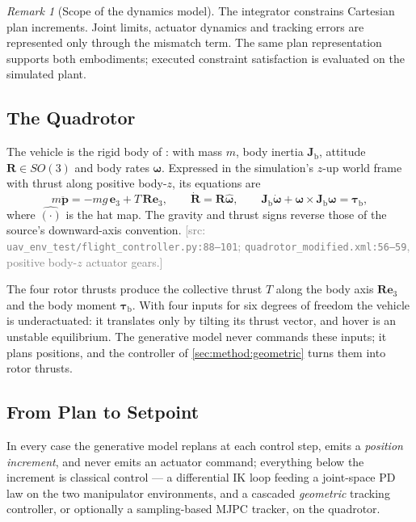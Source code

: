 \documentclass[headsepline,footsepline,footinclude=false,oneside,fontsize=11pt,paper=a4,listof=totoc,bibliography=totoc]{scrbook}
\theoremstyle{definition}
\theoremstyle{plain}
\theoremstyle{remark}
\newtheorem{remark}{Remark}[chapter]
\newcommand{\vect}[1]{\boldsymbol{#1}}
\newcommand{\matr}[1]{\boldsymbol{#1}}
\newcommand{\sidx}[1]{_{\textrm{#1}}}
\newcommand{\unitvec}[1]{\textbf{e}_{#1}}
\newif\ifsubmission
\newcommand{\srcnote}[1]{\ifsubmission\else\textcolor{gray}{\footnotesize\textsf{[src: #1]}}\fi}
\begin{document}
\begin{remark}[Scope of the dynamics model]\label{rem:eulermodel}
The integrator constrains Cartesian plan increments. Joint limits, actuator dynamics and tracking
errors are represented only through the mismatch term. The same plan representation supports both
embodiments; executed constraint satisfaction is evaluated on the simulated plant.
\end{remark}

\subsection{The Quadrotor}\label{sec:method:quadrotor}

The vehicle is the rigid body of \parencite[Eqs.~(2)--(5)]{lee2010geometric}: with mass $m$, body
inertia $\matr{J}\sidx{b}$, attitude $\matr{R}\in SO(3)$ and body rates $\vect{\omega}$.
Expressed in the simulation's $z$-up world frame with thrust along positive body-$z$, its equations are
\begin{equation}\label{eq:method:dep:plant}
  m\ddot{\vect{p}} = -m g\,\unitvec{3} + T\,\matr{R}\unitvec{3},
  \qquad
  \dot{\matr{R}} = \matr{R}\hat{\vect{\omega}},
  \qquad
  \matr{J}\sidx{b}\dot{\vect{\omega}} + \vect{\omega}\times\matr{J}\sidx{b}\vect{\omega} = \vect{\tau}\sidx{b},
\end{equation}
where $\hat{(\cdot)}$ is the hat map. The gravity and thrust signs reverse those of the
source's downward-axis convention.
\srcnote{\texttt{uav\_env\_test/flight\_controller.py:88--101};
\texttt{quadrotor\_modified.xml:56--59}, positive body-$z$ actuator gears.}

The four rotor thrusts produce the collective thrust $T$ along the body axis $\matr{R}\unitvec{3}$ and
the body moment $\vect{\tau}\sidx{b}$. With four inputs for six degrees of freedom the vehicle is
underactuated: it translates only by tilting its thrust vector, and hover is an unstable equilibrium.
The generative model never commands these inputs; it plans positions, and the controller of
\autoref{sec:method:geometric} turns them into rotor thrusts.

\subsection{From Plan to Setpoint}\label{sec:method:setpoint}

In every case the generative model replans at each control step, emits a \emph{position increment},
and never emits an actuator command; everything below the increment is classical control --- a
differential \ac{IK} loop feeding a joint-space PD law on the two manipulator environments, and a
cascaded \emph{geometric} tracking controller, or optionally a sampling-based \ac{MJPC} tracker, on
the quadrotor.
\end{document}

